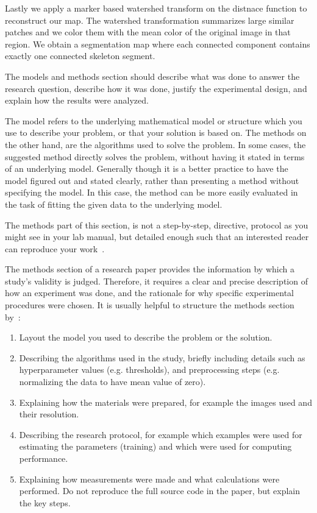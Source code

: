 \documentclass[10pt,conference,compsocconf]{IEEEtran}
\begin{document}
Lastly we apply a marker based watershed transform on the distnace function to reconstruct our map. The watershed transformation summarizes large similar patches and we color them with the mean color of the original image in that region. We obtain a segmentation map where each connected component contains exactly one connected skeleton segment. 





The models and methods
section should describe what was
done to answer the research question, describe how it was done,
justify the experimental design, and
explain how the results were analyzed.

The model refers to the underlying mathematical model or structure which 
you use to describe your problem, or that your solution is based on. 
The methods on the other hand, are the algorithms used to solve the problem. 
In some cases, the suggested method directly solves the problem, without having it 
stated in terms of an underlying model. Generally though it is a better practice to have 
the model figured out and stated clearly, rather than presenting a method without specifying 
the model. In this case, the method can be more easily evaluated in the task of fitting 
the given data to the underlying model.

The methods part of this section, is not a step-by-step, directive,
protocol as you might see in your lab manual, but detailed enough such
that an interested reader can reproduce your
work~\cite{anderson04,wavelab}.

The methods section of a research paper provides the information by
which a study's validity is judged.
Therefore, it requires a clear and precise description of how an
experiment was done, and the rationale
for why specific experimental procedures were chosen.
It is usually helpful to
structure the methods section by~\cite{kallet04methods}:
\begin{enumerate}
\item Layout the model you used to describe the problem or the solution.
\item Describing the algorithms used in the study, briefly including
  details such as hyperparameter values (e.g. thresholds), and
  preprocessing steps (e.g. normalizing the data to have mean value of
  zero).
\item Explaining how the materials were prepared, for example the
  images used and their resolution.
\item Describing the research protocol, for example which examples
  were used for estimating the parameters (training) and which were
  used for computing performance.
\item Explaining how measurements were made and what
  calculations were performed. Do not reproduce the full source code in
  the paper, but explain the key steps.
\end{enumerate}
\end{document}
